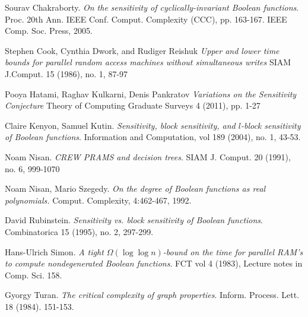 \documentclass[psamsfonts]{amsart}
\theoremstyle{definition}
\theoremstyle{remark}
\numberwithin{equation}{section}
\begin{document}
\begin{thebibliography}{6}

Sourav Chakraborty.
{\it On the sensitivity of cyclically-invariant Boolean functions}.
Proc. 20th Ann. IEEE Conf. Comput. Complexity (CCC), pp. 163-167.
IEEE Comp. Soc. Press, 2005.

Stephen Cook, Cynthia Dwork, and Rudiger Reishuk
{\it Upper and lower time bounds for parallel random access machines without simultaneous writes}
SIAM J.Comput. 15 (1986), no. 1, 87-97

Pooya Hatami, Raghav Kulkarni, Denis Pankratov
{\it Variations on the Sensitivity Conjecture}
Theory of Computing Graduate Surveys 4 (2011), pp. 1-27

Claire Kenyon, Samuel Kutin.
{\it Sensitivity, block sensitivity, and $l$-block sensitivity of Boolean functions}.
Information and Computation, vol 189 (2004), no. 1, 43-53.

Noam Nisan.
{\it CREW PRAMS and decision trees}.
SIAM J. Comput. 20 (1991), no. 6, 999-1070

Noam Nisan, Mario Szegedy.
{\it On the degree of Boolean functions as real polynomials.}
Comput. Complexity, 4:462-467, 1992.

David Rubinstein.
{\it Sensitivity vs. block sensitivity of Boolean functions}.
Combinatorica 15 (1995), no. 2, 297-299.

Hans-Ulrich Simon.
{\it A tight $\Omega(\log{\log{n}})$-bound on the time for parallel RAM's to compute nondegenerated Boolean functions}. FCT vol 4 (1983), Lecture notes in Comp. Sci. 158.

Gyorgy Turan.
{\it The critical complexity of graph properties}.
Inform. Process. Lett. 18 (1984). 151-153.

\end{thebibliography}
\end{document}

